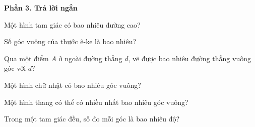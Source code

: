 \textbf{Phần 3. Trả lời ngắn}

\begin{ex} %
Một hình tam giác có bao nhiêu đường cao?
\end{ex}

\begin{ex} %
Số góc vuông của thước ê-ke là bao nhiêu?
\end{ex}

\begin{ex} %
Qua một điểm $A$ ở ngoài đường thẳng $d$, vẽ được bao nhiêu đường thẳng vuông góc với $d$?
\end{ex}

\begin{ex} %
Một hình chữ nhật có bao nhiêu góc vuông?
\end{ex}

\begin{ex} %
Một hình thang có thể có nhiều nhất bao nhiêu góc vuông?
\end{ex}

\begin{ex} %
Trong một tam giác đều, số đo mỗi góc là bao nhiêu độ?
\end{ex}
